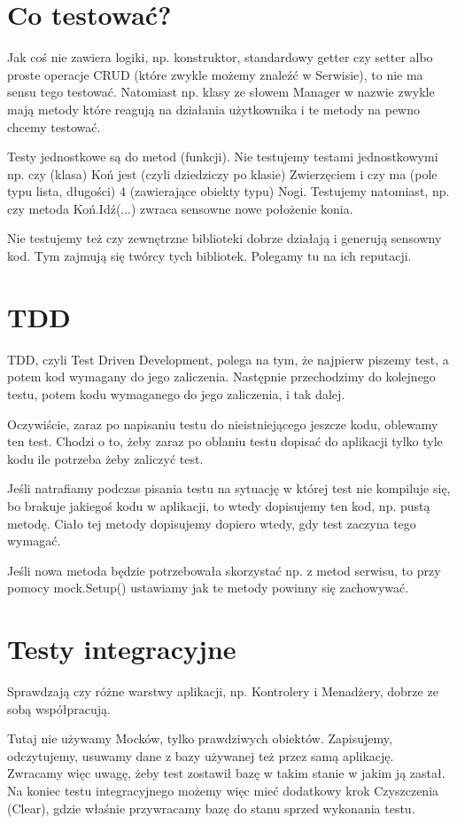 \documentclass[10pt]{article}
\begin{document}
\section{Co testować?}
Jak coś nie zawiera logiki, np. konstruktor, standardowy getter czy setter albo proste operacje CRUD (które zwykle możemy znaleźć w Serwisie), to nie ma sensu tego testować. Natomiast np. klasy ze słowem Manager w nazwie zwykle mają metody które reagują na działania użytkownika i te metody na pewno chcemy testować.

Testy jednostkowe są do metod (funkcji). Nie testujemy testami jednostkowymi np. czy (klasa) Koń jest (czyli dziedziczy po klasie) Zwierzęciem i czy ma (pole typu lista, długości) 4 (zawierające obiekty typu) Nogi. Testujemy natomiast, np. czy metoda Koń.Idź(...) zwraca sensowne nowe położenie konia.

Nie testujemy też czy zewnętrzne biblioteki dobrze działają i generują sensowny kod. Tym zajmują się twórcy tych bibliotek. Polegamy tu na ich reputacji.

\section{TDD}
TDD, czyli Test Driven Development, polega na tym, że najpierw piszemy test, a potem kod wymagany do jego zaliczenia. Następnie przechodzimy do kolejnego testu, potem kodu wymaganego do jego zaliczenia, i tak dalej.

Oczywiście, zaraz po napisaniu testu do nieistniejącego jeszcze kodu, oblewamy ten test. Chodzi o to, żeby zaraz po oblaniu testu dopisać do aplikacji tylko tyle kodu ile potrzeba żeby zaliczyć test.

Jeśli natrafiamy podczas pisania testu na sytuację w której test nie kompiluje się, bo brakuje jakiegoś kodu w aplikacji, to wtedy dopisujemy ten kod, np. pustą metodę. Ciało tej metody dopisujemy dopiero wtedy, gdy test zaczyna tego wymagać.

Jeśli nowa metoda będzie potrzebowała skorzystać np. z metod serwisu, to przy pomocy mock.Setup() ustawiamy jak te metody powinny się zachowywać.

\section{Testy integracyjne}
Sprawdzają czy różne warstwy aplikacji, np. Kontrolery i Menadżery, dobrze ze sobą współpracują.

Tutaj nie używamy Mocków, tylko prawdziwych obiektów. Zapisujemy, odczytujemy, usuwamy dane z bazy używanej też przez samą aplikację. Zwracamy więc uwagę, żeby test zostawił bazę w takim stanie w jakim ją zastał. Na koniec testu integracyjnego możemy więc mieć dodatkowy krok Czyszczenia (Clear), gdzie właśnie przywracamy bazę do stanu sprzed wykonania testu.
\end{document}
